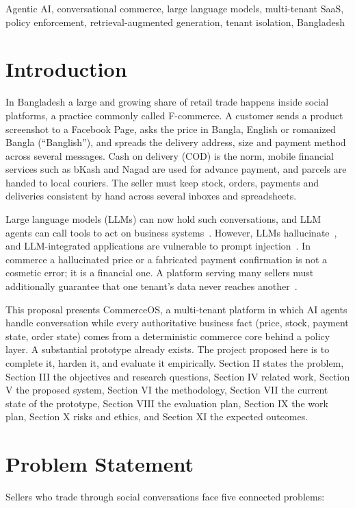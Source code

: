 \documentclass[conference,a4paper]{IEEEtran}
\begin{document}
\begin{IEEEkeywords}
Agentic AI, conversational commerce, large language models, multi-tenant SaaS, policy enforcement, retrieval-augmented generation, tenant isolation, Bangladesh
\end{IEEEkeywords}


\section{Introduction}
In Bangladesh a large and growing share of retail trade happens inside social platforms, a practice commonly called F-commerce. A customer sends a product screenshot to a Facebook Page, asks the price in Bangla, English or romanized Bangla (``Banglish''), and spreads the delivery address, size and payment method across several messages. Cash on delivery (COD) is the norm, mobile financial services such as bKash and Nagad are used for advance payment, and parcels are handed to local couriers. The seller must keep stock, orders, payments and deliveries consistent by hand across several inboxes and spreadsheets.

Large language models (LLMs) can now hold such conversations, and LLM agents can call tools to act on business systems~\cite{yao,schick,wang}. However, LLMs hallucinate~\cite{ji}, and LLM-integrated applications are vulnerable to prompt injection~\cite{greshake,owaspllm}. In commerce a hallucinated price or a fabricated payment confirmation is not a cosmetic error; it is a financial one. A platform serving many sellers must additionally guarantee that one tenant's data never reaches another~\cite{chong,guo}.

This proposal presents CommerceOS, a multi-tenant platform in which AI agents handle conversation while every authoritative business fact (price, stock, payment state, order state) comes from a deterministic commerce core behind a policy layer. A substantial prototype already exists. The project proposed here is to complete it, harden it, and evaluate it empirically. Section II states the problem, Section III the objectives and research questions, Section IV related work, Section V the proposed system, Section VI the methodology, Section VII the current state of the prototype, Section VIII the evaluation plan, Section IX the work plan, Section X risks and ethics, and Section XI the expected outcomes.


\section{Problem Statement}
Sellers who trade through social conversations face five connected problems:
\end{document}
